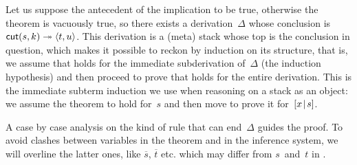 Let us suppose the antecedent of the implication to be true, otherwise
the theorem is vacuously true, so there exists a derivation~\(\Delta\)
whose conclusion is \(\textsf{cut}(s,k) \twoheadrightarrow
\langle{t},{u}\rangle\). This derivation is a (meta) stack whose top is the
conclusion in question, which makes it possible to reckon by induction
on its structure, that is, we assume that  holds for
the immediate sub\-derivation of~\(\Delta\) (the induction hypothesis)
and then proceed to prove that  holds for the entire
derivation. This is the immediate subterm induction we use when
reasoning on a stack as an object: we assume the theorem to hold
for~\(s\) and then move to prove it for~\([{x}\!\mid\!{s}]\).

A case by case analysis on the kind of rule that can end~\(\Delta\)
guides the proof. To avoid clashes between variables in the theorem
and in the inference system, we will overline the latter ones, like
\(\overline{s}\), \(\overline{t}\) etc. which may differ from
\(s\)~and~\(t\) in .
